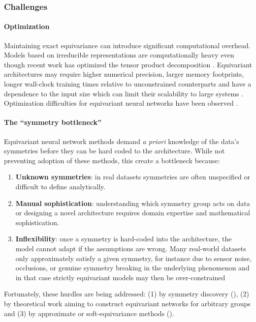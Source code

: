 \documentclass[mathematics,review,submit,moreauthors]{Definitions/mdpi}
\begin{document}
\subsubsection{Challenges}

\paragraph{Optimization}
Maintaining exact equivariance can introduce significant computational overhead.
Models based on irreducible representations are computationally heavy even though recent work has optimized the tensor product decomposition \citep{passaro2023,luo2024a}.
Equivariant architectures may require higher numerical precision, larger memory footprints, longer wall-clock training times relative to unconstrained counterparts and have a dependence to the input size which can limit their scalability to large systems \citep{bogatskiy2020p3icml}.
Optimization difficulties for equivariant neural networks have been observed \citep{pertigkiozoglou2024,lawrence2026}.

\paragraph{The ``symmetry bottleneck''}\label{par:sym-bottleneck}
Equivariant neural network methods demand \textit{a priori} knowledge of the data's symmetries before they can be hard coded to the architecture.
While not preventing adoption of these methods, this create a bottleneck because:
\begin{enumerate}
    \item \textbf{Unknown symmetries}: in real datasets symmetries are often unspecified or difficult to define analytically.
    \item \textbf{Manual sophistication}: understanding which symmetry group acts on data or designing a novel architecture requires domain expertise and mathematical sophistication.
    \item \textbf{Inflexibility}: once a symmetry is hard-coded into the architecture, the model cannot adapt if the assumptions are wrong.
    Many real-world datasets only approximately satisfy a given symmetry, for instance due to sensor noise, occlusions, or genuine symmetry breaking in the underlying phenomenon and in that case strictly equivariant models may then be over-constrained
\end{enumerate}
Fortunately, these hurdles are being addressed: (1) by symmetry discovery (), (2) by theoretical work aiming to construct equivariant networks for arbitrary groups and (3) by approximate or soft-equivariance methods ().
\end{document}
